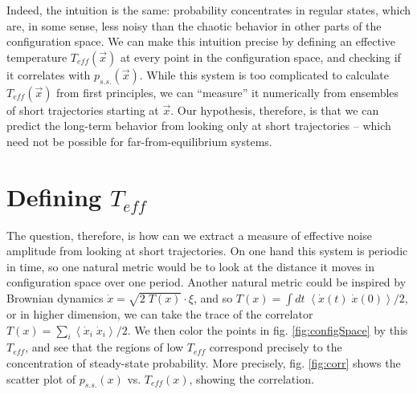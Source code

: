 \documentclass[11pt]{article}
\renewcommand{\v}[1]{\ensuremath{\vec{#1}}} %
\renewcommand{\=}[1]{\stackrel{#1}{=}} %
\renewcommand{\(}{\left (}
\renewcommand{\)}{\right  )}
\renewcommand{\[}{\left [}
\renewcommand{\]}{\right ]}
\newcommand{\<}{\left <}
\renewcommand{\>}{\right >}
\theoremstyle{definition}
\theoremstyle{remark}
\renewcommand{\todo}[1]{\textit{\color{red}[#1]}}
\begin{document}
Indeed, the intuition is the same: probability concentrates in regular states, which are, in some sense, less noisy than the chaotic behavior in other parts of the configuration space. We can make this intuition precise by defining an effective temperature $ T_{eff}(\v{x}) $ at every point in the configuration space, and checking if it correlates with $ p_{s.s.}(\v{x}) $. While this system is too complicated to calculate $ T_{eff} (\v{x})$ from first principles, we can ``measure'' it numerically from ensembles of short trajectories starting at $ \v{x} $. Our hypothesis, therefore, is that we can predict the long-term behavior from looking only at short trajectories -- which need not be possible for far-from-equilibrium systems. 


\section{Defining $ T_{eff} $}
The question, therefore, is how can we extract a measure of effective noise amplitude from looking at short trajectories. On one hand this system is periodic in time, so one natural metric would be to look at the distance it moves in configuration space over one period. Another natural metric could be inspired by Brownian dynamics $ \dot{x}=\sqrt{2\;T(x)}\cdot\xi $, and so $ T(x)=\int dt\;\<\dot{x}(t)\;\dot{x}(0)\>/2 $, or in higher dimension, we can take the trace of the correlator $ T(x)=\sum_i\<\dot{x}_i\;\dot{x}_i\>/2 $. 
We then color the points in fig. \ref{fig:configSpace} by this $ T_{eff} $, and see that the regions of low $ T_{eff} $ correspond precisely to the concentration of steady-state probability. More precisely, fig. \ref{fig:corr} shows the scatter plot of $ p_{s.s.}(x) $ vs. $ T_{eff}(x) $, showing the correlation.
\end{document}

